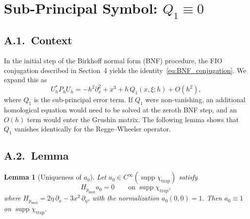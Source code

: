 \documentclass[12pt,a4paper]{amsart}
\newtheorem{lemma}[theorem]{Lemma}
\theoremstyle{remark}
\begin{document}
\appendix

\section{Sub-Principal Symbol: $Q_1 \equiv 0$}

\subsection*{A.1.~Context}

In the initial step of the Birkhoff normal form (BNF) procedure, the FIO conjugation
described in Section~4 yields the identity~\eqref{eq:BNF_conjugation}. We expand this as
\[
  U_h^* P_h U_h = -h^2\partial_x^2 + x^3 + h\,Q_1(x,\xi;h) + O(h^2),
\]
where $Q_1$ is the sub-principal error term. If $Q_1$ were non-vanishing, an additional homological
equation would need to be solved at the zeroth BNF step, and an $O(h)$ term would
enter the Grushin matrix. The following lemma shows that $Q_1$ vanishes identically for
the Regge--Wheeler operator.

\subsection*{A.2.~Lemma}

\begin{lemma}[Uniqueness of $a_0$]
\label{lem:a0_unique}
Let $a_0 \in C^\infty(\operatorname{supp}\chi_{\mathrm{trap}})$ satisfy
\begin{equation}\label{eq:transport}
  H_{p_{\mathrm{mod}}} a_0 = 0
  \qquad \text{on } \operatorname{supp}\chi_{\mathrm{trap}},
\end{equation}
where $H_{p_{\mathrm{mod}}} = 2\eta\,\partial_x - 3x^2\,\partial_\eta$,
with the normalization $a_0(0,0) = 1$.
Then $a_0 \equiv 1$ on $\operatorname{supp}\chi_{\mathrm{trap}}$.
\end{lemma}
\end{document}
